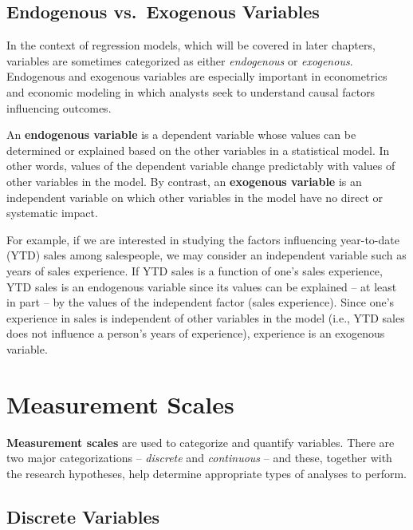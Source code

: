\documentclass[
]{book}
\begin{document}
\hypertarget{endogenous-vs.-exogenous-variables}{%
\subsection{Endogenous vs.~Exogenous Variables}\label{endogenous-vs.-exogenous-variables}}

In the context of regression models, which will be covered in later chapters, variables are sometimes categorized as either \emph{endogenous} or \emph{exogenous}. Endogenous and exogenous variables are especially important in econometrics and economic modeling in which analysts seek to understand causal factors influencing outcomes.

An \textbf{endogenous variable} is a dependent variable whose values can be determined or explained based on the other variables in a statistical model. In other words, values of the dependent variable change predictably with values of other variables in the model. By contrast, an \textbf{exogenous variable} is an independent variable on which other variables in the model have no direct or systematic impact.

For example, if we are interested in studying the factors influencing year-to-date (YTD) sales among salespeople, we may consider an independent variable such as years of sales experience. If YTD sales is a function of one's sales experience, YTD sales is an endogenous variable since its values can be explained -- at least in part -- by the values of the independent factor (sales experience). Since one's experience in sales is independent of other variables in the model (i.e., YTD sales does not influence a person's years of experience), experience is an exogenous variable.

\hypertarget{measurement-scales}{%
\section{Measurement Scales}\label{measurement-scales}}

\textbf{Measurement scales} are used to categorize and quantify variables. There are two major categorizations -- \emph{discrete} and \emph{continuous} -- and these, together with the research hypotheses, help determine appropriate types of analyses to perform.

\hypertarget{discrete-variables}{%
\subsection{Discrete Variables}\label{discrete-variables}}
\end{document}
